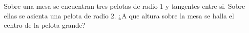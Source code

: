 Sobre una mesa se encuentran tres pelotas de radio $1$ y tangentes entre si. Sobre ellas se asienta una pelota de radio $2$. ¿A que altura sobre la mesa se halla el centro de la pelota grande?